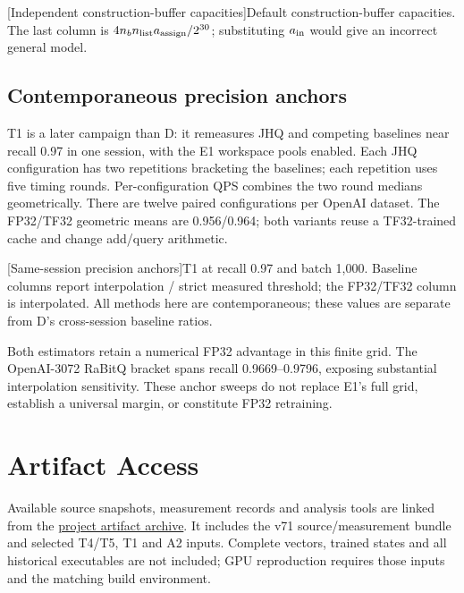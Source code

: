 \par\medskip\noindent\begin{minipage}{\linewidth}
\centering\captionsetup{hypcap=false}
[Independent construction-buffer capacities]{Default construction-buffer capacities.
The last column is $4n_b n_{\rm list}a_{\rm assign}/2^{30}$; substituting
$a_{\rm in}$ would give an incorrect general model.}
\label{tab:b-scratch}
\footnotesize
\end{minipage}\par\medskip

\subsection{Contemporaneous precision anchors}
\label{sec:b-precision-anchors}

T1 is a later campaign than D: it remeasures JHQ and competing baselines
near recall 0.97 in one session, with the E1 workspace pools enabled.
Each JHQ configuration has two repetitions bracketing the baselines;
each repetition uses five timing rounds. Per-configuration QPS combines
the two round medians geometrically. There are twelve paired configurations
per OpenAI dataset. The FP32/TF32 geometric means are 0.956/0.964;
both variants reuse a TF32-trained cache and change add/query arithmetic.

\par\medskip\noindent\begin{minipage}{\linewidth}
\centering\captionsetup{hypcap=false}
[Same-session precision anchors]{T1 at recall 0.97 and batch 1,000.
Baseline columns report interpolation / strict measured threshold;
the FP32/TF32 column is interpolated. All methods here are contemporaneous;
these values are separate from D's cross-session baseline ratios.}
\label{tab:b-precision-anchors}
\footnotesize\setlength{\tabcolsep}{3pt}

\end{minipage}\par\medskip

Both estimators retain a numerical FP32 advantage in this finite grid.
The OpenAI-3072 RaBitQ bracket spans recall 0.9669--0.9796, exposing
substantial interpolation sensitivity. These anchor sweeps do not replace
E1's full grid, establish a universal margin, or constitute FP32 retraining.


\section{Artifact Access}
\label{sec:b-artifacts}
Available source snapshots, measurement records and analysis tools are
linked from the
\href{https://github.com/lrlorry/8800_report/blob/main/docs/artifact-access.md}{project artifact archive}.
It includes the v71 source/measurement bundle and selected T4/T5, T1 and A2
inputs. Complete vectors, trained states and all historical executables
are not included; GPU reproduction requires those inputs and the matching
build environment.
